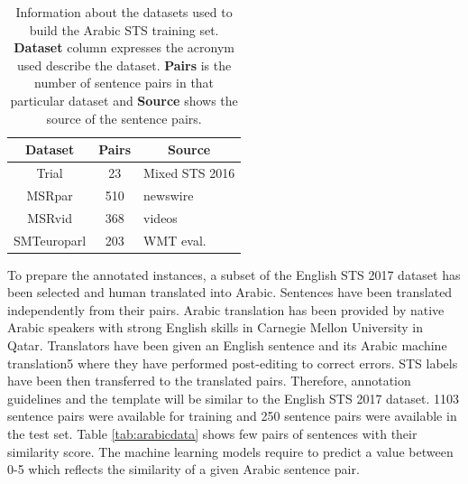 \begin{enumerate}
\begin{table}[ht!]
	\centering
	\begin{tabular}{c|c|l}
		\hline
		\multicolumn{1}{c|}{\textbf{Dataset}} & 
		\multicolumn{1}{c|}{\textbf{Pairs}} & 
		\multicolumn{1}{c}{\textbf{Source}} \\
		\hline
		Trial & 23 & Mixed STS 2016 \\
		MSRpar  & 510 & newswire \\
		MSRvid  & 368 & videos \\
		SMTeuroparl  & 203 & WMT eval. \\
		\hline
	\end{tabular}
	\caption[Information about Arabic STS training set]{Information about the datasets used to build the Arabic STS training set. \textbf{Dataset} column expresses the acronym used describe the dataset. \textbf{Pairs} is the number of sentence pairs in that particular dataset and \textbf{Source} shows the source of the sentence pairs. }
	\label{tab:arabicdata_info}
\end{table}  

To prepare the annotated instances, a subset of the English STS 2017 dataset has been selected and human translated into Arabic. Sentences have been translated independently from their pairs. Arabic translation has been provided by native Arabic speakers with strong English skills in Carnegie Mellon University in Qatar. Translators have been given an English sentence and its Arabic machine translation5 where they have performed post-editing to correct errors. STS labels have been then transferred to the translated pairs. Therefore, annotation guidelines and the template will be similar to the English STS 2017 dataset. 1103 sentence pairs were available for training and 250 sentence pairs were available in the test set. Table \ref{tab:arabicdata} shows few pairs of sentences with their similarity score. The machine learning models require to predict a value between 0-5 which reflects the similarity of a given Arabic sentence pair. 


\end{enumerate}
